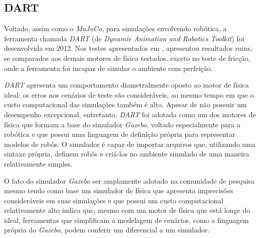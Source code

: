 \documentclass[cic,tc]{iiufrgs}
\begin{document}
\subsection{DART}
Voltado, assim como o \textit{MuJoCo}, para simulações envolvendo robótica,
a ferramenta chamada \textit{DART} (de \textit{Dynamie Animation and Robotics
Toolkit}) foi desenvolvida em 2012. Nos testes apresentados em \cite{LeggedRobotics2018}, apresentou
resultados ruins, se comparados aos demais motores de física testados.
exceto no teste de fricção, onde a ferramenta foi incapaz de simular o ambiente
com perfeição.

\textit{DART} apresenta um comportamento diametralmente oposto ao motor de
física ideal: os erros nos cenários de teste são consideráveis, ao mesmo tempo
em que o custo computacional das simulações também é alto.
Apesar de não possuir um desempenho excepcional, entretanto, \textit{DART} foi
adotada como
um dos motores de física que formam a base do simulador \textit{Gazebo}, voltado
especialmente para a robótica e que possui uma linguagem de definição própria
para representar modelos de robôs. O simulador é capaz de importar arquivos que,
utilizando uma sintaxe própria, definem robôs e criá-los no ambiente simulado de
uma maneira relativamente simples.


O fato do simulador \textit{Gazebo} ser amplamente adotado na comunidade de
pesquisa mesmo tendo como base um simulador de física que apresenta imprecisões
consideráveis em suas simulações e que possui um custo computacional
relativamente alto indica que, mesmo com um motor de física que está longe do
ideal, ferramentas que simplificam a modelagem de cenários, como a linguagem
própria do \textit{Gazebo}, podem conferir um diferencial a um simulador.
\end{document}
